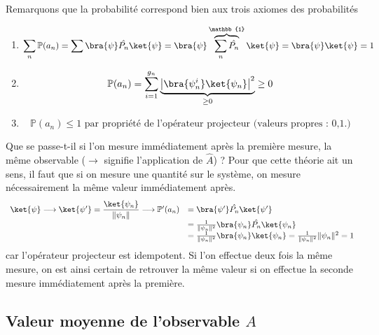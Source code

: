  Remarquons que la probabilité correspond bien aux trois axiomes des probabilités
 \begin{enumerate}
  \item \begin{equation}
 \sum_n \mathbb{P}(a_n) = \sum\bra{\psi}\hat{P_n}\ket{\psi} = \bra{\psi}\overbrace{
 \sum_n \hat{P_n}}^{\mathbb{1}}\ket{\psi} = \bra{\psi}\ket{\psi} = 1
 \end{equation}
 \item\begin{equation}
 \mathbb{P}(a_n) = \sum_{i=1}^{g_n} \underbrace{\left|\bra{\psi_n^i}\ket{\psi_n}
 \right|^2}_{\geq 0} \geq 0
 \end{equation}
 \item  
 \begin{equation}
 \mathbb{P}(a_n) \leq 1 \text{ par propriété de l'opérateur projecteur (valeurs propres : 0,1.)}
 \end{equation}
 \end{enumerate}
 Que se passe-t-il si l'on mesure immédiatement après la première mesure, la 
 même observable ($\longrightarrow$ signifie l'application de $\hat{A}$) ?
 Pour que cette théorie ait un sens, il faut que si on mesure une quantité sur le
 système, on mesure nécessairement la même valeur immédiatement après.
 \begin{equation}
 \begin{array}{ll}
 \ket{\psi} \longrightarrow \ket{\psi'} = \dfrac{\ket{\psi_n}}{\|\psi_n\|} \longrightarrow
 \mathbb{P}'(a_n) &= \bra{\psi'}\hat{P_n}\ket{\psi'}\\
 &= \frac{1}{\|\psi_n\|^2}\bra{\psi_n}\hat{P_n}\ket{\psi_n}\\
 &= \frac{1}{\|\psi_n\|^2}\bra{\psi_n}\ket{\psi_n} = \frac{1}{\|\psi_n\|^2}\|\psi_n\|^2=1
\end{array}
 \end{equation}
 car l'opérateur projecteur est idempotent. Si l'on effectue deux fois la même mesure, on 
 est ainsi certain de retrouver la même valeur si on effectue la seconde mesure immédiatement 
 après la première.
 
 \subsection{Valeur moyenne de l'observable $\hat{A}$}
 
